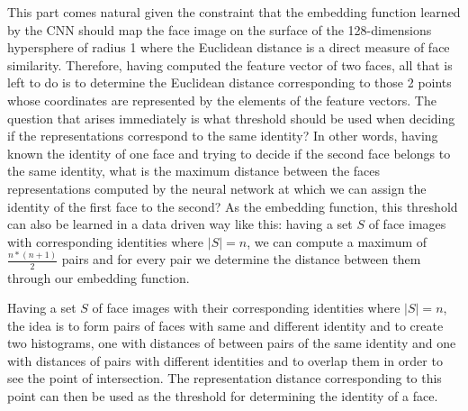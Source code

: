This part comes natural given the constraint that the embedding function learned by the CNN should map the face image on the surface of the 128-dimensions hypersphere of radius 1 where the Euclidean distance is a direct measure of face similarity. Therefore, having computed the feature vector of two faces, all that is left to do is to determine the Euclidean distance corresponding to those 2 points whose coordinates are represented by the elements of the feature vectors. 
The question that arises immediately is what threshold should be used when deciding if the representations correspond to the same identity? In other words, having known the identity of one face and trying to decide if the second face belongs to the same identity, what is the maximum distance between the faces representations computed by the neural network at which we can assign the identity of the first face to the second? As the embedding function, this threshold can also be learned in a data driven way like this: having a set $S$ of face images with corresponding identities where $|S| = n$, we can compute a maximum of $\frac{n*(n+1)}{2}$ pairs and for every pair we determine the distance between them through our embedding function. 

Having a set $S$ of face images with their corresponding identities where $|S| = n$, the idea is to form pairs of faces with same and different identity and to create two histograms, one with distances of between pairs of the same identity and one with distances of pairs with different identities and to overlap them in order to see the point of intersection. The representation distance corresponding to this point can then be used as the threshold for determining the identity of a face.


